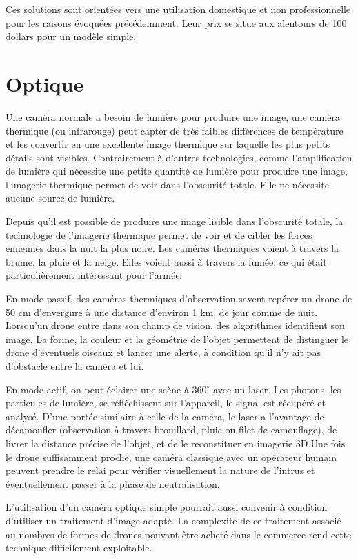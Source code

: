  Ces solutions sont orientées vers une utilisation domestique et non professionnelle pour les raisons évoquées précédemment. Leur prix se situe aux alentours de 100 dollars pour un modèle simple.

\section{Optique}

Une caméra normale a besoin de lumière pour produire une image, une caméra thermique (ou infrarouge) peut capter de très faibles différences de température et les convertir en une excellente image thermique sur laquelle les plus petits détails sont visibles. Contrairement à d'autres technologies, comme l'amplification de lumière qui nécessite une petite quantité de lumière pour produire une image, l'imagerie thermique permet de voir dans l'obscurité totale. Elle ne nécessite aucune source de lumière.

Depuis qu'il est possible de produire une image lisible dans l'obscurité totale, la technologie de l'imagerie thermique permet de voir et de cibler les forces ennemies dans la nuit la plus noire. Les caméras thermiques voient à travers la brume, la pluie et la neige. Elles voient aussi à travers la fumée, ce qui était particulièrement intéressant pour l'armée.\cite{optique}

En mode passif, des caméras thermiques d'observation savent repérer un drone de 50 cm d'envergure à une distance d'environ 1 km, de jour comme de nuit. Lorsqu'un drone entre dans son champ de vision, des algorithmes identifient son image. La forme, la couleur et la géométrie de l'objet permettent de distinguer le drone d'éventuels oiseaux et lancer une alerte, à condition qu'il n'y ait pas d'obstacle entre la caméra et lui.

En mode actif, on peut éclairer une scène à $360^{\circ}$ avec un laser. Les photons, les particules de lumière, se réfléchissent sur l'appareil, le signal est récupéré et analysé. D'une portée similaire à celle de la caméra, le laser a l'avantage de décamoufler (observation à travers brouillard, pluie ou filet de camouflage), de livrer la distance précise de l'objet, et de le reconstituer en imagerie 3D.Une fois le drone suffisamment proche, une caméra classique avec un opérateur humain peuvent prendre le relai pour vérifier visuellement la nature de l'intrus et éventuellement passer à la phase de neutralisation.

L'utilisation d'un caméra optique simple pourrait aussi convenir à condition d'utiliser un traitement d'image adapté. La complexité de ce traitement associé au nombres de formes de drones pouvant être acheté dans le commerce rend cette technique difficilement exploitable.


